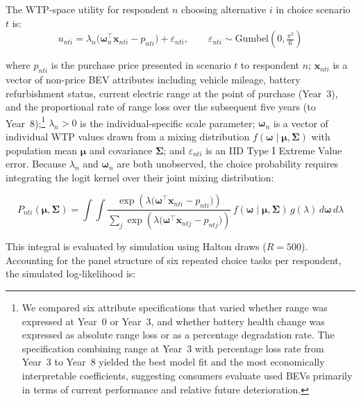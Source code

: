 \documentclass[a4paper,fleqn]{cas-sc}   %
\begin{document}
The WTP-space utility for respondent $n$ choosing alternative $i$ in choice scenario $t$ is:
\begin{equation}
    u_{nti} = \lambda_n \bigl(\boldsymbol{\omega}_n^{\top} \mathbf{x}_{nti} - p_{nti}\bigr) + \varepsilon_{nti}, \qquad \varepsilon_{nti} \sim \mathrm{Gumbel}\!\left(0,\tfrac{\pi^2}{6}\right)
    \label{eq:mxl_utility}
\end{equation}

\noindent where $p_{nti}$ is the purchase price presented in scenario $t$ to respondent $n$; $\mathbf{x}_{nti}$ is a vector of non-price BEV attributes including vehicle mileage, battery refurbishment status, current electric range at the point of purchase (Year~3), and the proportional rate of range loss over the subsequent five years (to Year~8);\footnote{We compared six attribute specifications that varied whether range was expressed at Year~0 or Year~3, and whether battery health change was expressed as absolute range loss or as a percentage degradation rate. The specification combining range at Year~3 with percentage loss rate from Year~3 to Year~8 yielded the best model fit and the most economically interpretable coefficients, suggesting consumers evaluate used BEVs primarily in terms of current performance and relative future deterioration.} $\lambda_n > 0$ is the individual-specific scale parameter; $\boldsymbol{\omega}_n$ is a vector of individual WTP values drawn from a mixing distribution $f(\boldsymbol{\omega} \mid \boldsymbol{\mu}, \boldsymbol{\Sigma})$ with population mean $\boldsymbol{\mu}$ and covariance $\boldsymbol{\Sigma}$; and $\varepsilon_{nti}$ is an IID Type I Extreme Value error. Because $\lambda_n$ and $\boldsymbol{\omega}_n$ are both unobserved, the choice probability requires integrating the logit kernel over their joint mixing distribution:

\begin{equation}
    P_{nti}(\boldsymbol{\mu}, \boldsymbol{\Sigma}) = \int\!\int \frac{\exp\!\left(\lambda\bigl(\boldsymbol{\omega}^{\top}\mathbf{x}_{nti} - p_{nti}\bigr)\right)}{\displaystyle\sum_{j} \exp\!\left(\lambda\bigl(\boldsymbol{\omega}^{\top}\mathbf{x}_{ntj} - p_{ntj}\bigr)\right)} \, f(\boldsymbol{\omega} \mid \boldsymbol{\mu}, \boldsymbol{\Sigma})\, g(\lambda) \, d\boldsymbol{\omega}\, d\lambda
    \label{eq:mxl_prob}
\end{equation}

\noindent This integral is evaluated by simulation using Halton draws ($R = 500$). Accounting for the panel structure of six repeated choice tasks per respondent, the simulated log-likelihood is:
\end{document}

